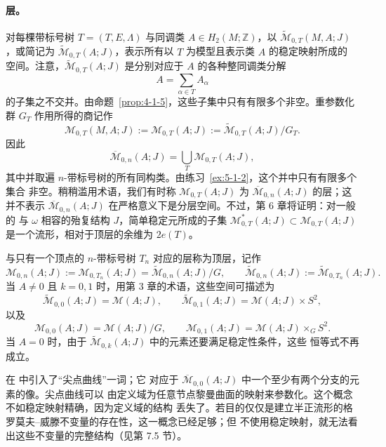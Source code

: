\paragraph{层。}
对每棵带标号树 $T=(T,E,\Lambda)$ 与同调类 $A\in H_2(M;\mathbb Z)$，以
$\widetilde{\mathcal M}_{0,T}(M,A;J)$，或简记为
$\widetilde{\mathcal M}_{0,T}(A;J)$，表示所有以 $T$ 为模型且表示类 $A$ 的稳定映射所成的
空间。注意，$\widetilde{\mathcal M}_{0,T}(A;J)$ 是分别对应于 $A$ 的各种整同调类分解
\[
  A=\sum_{\alpha\in T}A_\alpha
\]
的子集之不交并。由命题~\ref{prop:4-1-5}，这些子集中只有有限多个非空。重参数化群 $G_T$
作用所得的商记作
\begin{equation}\label{eq:5-1-5}
  \mathcal M_{0,T}(M,A;J):=\mathcal M_{0,T}(A;J)
  :=\widetilde{\mathcal M}_{0,T}(A;J)/G_T.
\end{equation}
因此
\[
  \overline{\mathcal M}_{0,n}(A;J)
  =\bigcup_T\mathcal M_{0,T}(A;J),
\]
其中并取遍 $n$-带标号树的所有同构类。由练习~\ref{ex:5-1-2}，这个并中只有有限多个集合
非空。稍稍滥用术语，我们有时称 $\mathcal M_{0,T}(A;J)$ 为
$\overline{\mathcal M}_{0,n}(A;J)$ 的层；这并不表示
$\overline{\mathcal M}_{0,n}(A;J)$ 在严格意义下是分层空间。不过，第 6 章将证明：对一般的
与 $\omega$ 相容的殆复结构 $J$，简单稳定元所成的子集
$\mathcal M^*_{0,T}(A;J)\subset\mathcal M_{0,T}(A;J)$ 是一个流形，相对于顶层的余维为
$2e(T)$。

与只有一个顶点的 $n$-带标号树 $T_n$ 对应的层称为顶层，记作
\[
  \mathcal M_{0,n}(A;J):=\mathcal M_{0,T_n}(A;J)
  =\widetilde{\mathcal M}_{0,n}(A;J)/G,
  \qquad
  \widetilde{\mathcal M}_{0,n}(A;J):=\widetilde{\mathcal M}_{0,T_n}(A;J).
\]
当 $A\ne0$ 且 $k=0,1$ 时，用第 3 章的术语，这些空间可描述为
\[
  \widetilde{\mathcal M}_{0,0}(A;J)=\mathcal M(A;J),
  \qquad
  \widetilde{\mathcal M}_{0,1}(A;J)=\mathcal M(A;J)\times S^2,
\]
以及
\[
  \mathcal M_{0,0}(A;J)=\mathcal M(A;J)/G,
  \qquad
  \mathcal M_{0,1}(A;J)=\mathcal M(A;J)\times_G S^2.
\]
当 $A=0$ 时，由于 $\widetilde{\mathcal M}_{0,k}(A;J)$ 中的元素还要满足稳定性条件，这些
恒等式不再成立。

在  中引入了“尖点曲线”一词；它
对应于 $\overline{\mathcal M}_{0,0}(A;J)$ 中一个至少有两个分支的元素的像。尖点曲线可以
由定义域为任意节点黎曼曲面的映射来参数化。这个概念不如稳定映射精确，因为定义域的结构
丢失了。若目的仅仅是建立半正流形的格罗莫夫--威滕不变量的存在性，这一概念已经足够；但
不使用稳定映射，就无法看出这些不变量的完整结构（见第 7.5 节）。


